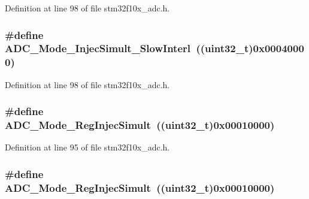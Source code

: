 Definition at line 98 of file stm32f10x\+\_\+adc.\+h.

\subsubsection[{\texorpdfstring{A\+D\+C\+\_\+\+Mode\+\_\+\+Injec\+Simult\+\_\+\+Slow\+Interl}{ADC_Mode_InjecSimult_SlowInterl}}]{\setlength{\rightskip}{0pt plus 5cm}\#define A\+D\+C\+\_\+\+Mode\+\_\+\+Injec\+Simult\+\_\+\+Slow\+Interl~(({\bf uint32\+\_\+t})0x00040000)}\hypertarget{group___a_d_c__mode_gacb72230cb48a577907729d426be69c22}{}\label{group___a_d_c__mode_gacb72230cb48a577907729d426be69c22}


Definition at line 98 of file stm32f10x\+\_\+adc.\+h.

\subsubsection[{\texorpdfstring{A\+D\+C\+\_\+\+Mode\+\_\+\+Reg\+Injec\+Simult}{ADC_Mode_RegInjecSimult}}]{\setlength{\rightskip}{0pt plus 5cm}\#define A\+D\+C\+\_\+\+Mode\+\_\+\+Reg\+Injec\+Simult~(({\bf uint32\+\_\+t})0x00010000)}\hypertarget{group___a_d_c__mode_ga487d5f0c506291c5d37b53198396fd1c}{}\label{group___a_d_c__mode_ga487d5f0c506291c5d37b53198396fd1c}


Definition at line 95 of file stm32f10x\+\_\+adc.\+h.

\subsubsection[{\texorpdfstring{A\+D\+C\+\_\+\+Mode\+\_\+\+Reg\+Injec\+Simult}{ADC_Mode_RegInjecSimult}}]{\setlength{\rightskip}{0pt plus 5cm}\#define A\+D\+C\+\_\+\+Mode\+\_\+\+Reg\+Injec\+Simult~(({\bf uint32\+\_\+t})0x00010000)}\hypertarget{group___a_d_c__mode_ga487d5f0c506291c5d37b53198396fd1c}{}\label{group___a_d_c__mode_ga487d5f0c506291c5d37b53198396fd1c}


